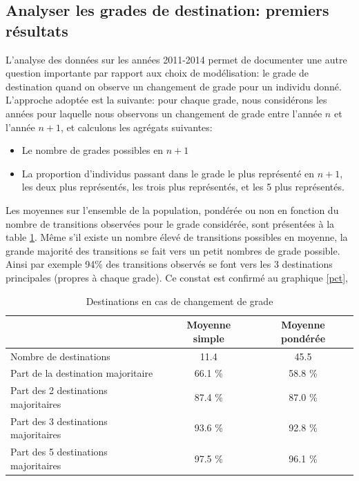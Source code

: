 \documentclass[11pt,a4paper]{article}
\begin{document}
\subsection{Analyser les grades de destination: premiers résultats}

L'analyse des données sur les années 2011-2014 permet de documenter une autre question importante par rapport aux choix de modélisation: le grade de destination quand on observe un changement de grade pour un individu donné. L'approche adoptée est la suivante: pour chaque grade, nous considérons les années pour laquelle nous observons un changement de grade entre l'année $n$ et l'année $n+1$, et calculons les agrégats suivantes: 


\begin{itemize}[leftmargin=1cm ,parsep=0cm,itemsep=0cm,topsep=0cm] 
\item Le nombre de grades possibles en $n+1$
\item La proportion d'individus passant dans le grade le plus représenté en $n+1$, les deux plus représentés, les trois plus représentés, et les 5 plus représentés. 
\end{itemize}

Les moyennes sur l'ensemble de la population, pondérée ou non en fonction du nombre de transitions observées pour le grade considérée, sont présentées à la table \ref{means}. Même s'il existe un nombre élevé de transitions possibles en moyenne, la grande majorité des transitions se fait vers un petit nombres de grade possible. Ainsi par exemple 94\% des transitions observés se font vers les 3 destinations principales (propres à chaque grade). Ce constat est confirmé au graphique \ref{pct},

\begin{table}[ht]
\label{means}
\centering
\caption{Destinations en cas de changement de grade} 
\begin{tabular}{l|cc}
  \hline
 & Moyenne simple & Moyenne pondérée \\ 
  \hline
Nombre de destinations & 11.4 & 45.5 \\ 
  Part de la destination majoritaire   & 66.1 \% & 58.8 \%  \\ 
  Part des 2 destinations majoritaires & 87.4 \% & 87.0 \% \\ 
  Part des 3 destinations majoritaires & 93.6 \% & 92.8 \% \\ 
  Part des 5 destinations majoritaires & 97.5 \% & 96.1 \% \\ 
   \hline
\end{tabular}
\end{table}
\end{document}
